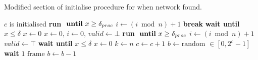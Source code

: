 \begin{algorithm}[h]
\caption{Modified section of initialise procedure for when network found.}
\label{lst:pseudoInitMulti}
\begin{algorithmic}[1]
\Require $c$ is initialised
        \State \textbf{run}  $\text{ \textbf{until} }x \ge \delta_{proc}$ 
        \State $i \gets (i \bmod n) + 1$
                \State {}
                \State \textbf{break}
            \EndIf
        \EndWhile
        \State \textbf{wait until } $x \le \delta$
        \State $x \gets 0$
    \EndWhile
    \State {} 
    \State $x \gets 0,\, i \gets 0,\, valid \gets \bot$
        \State \textbf{run}  $\text{ \textbf{until} }x \ge \delta_{proc}$
        \State $i \gets (i \bmod n) + 1$
                \State {}
                    \State $valid \gets \top$
                \EndIf
            \EndIf
        \EndWhile
        \State \textbf{wait until } $x \le \delta$
        \State $x \gets 0$ 
    \EndWhile
        \State $k \gets n$ 
        \State {}
    \Else
            \State $c \gets c+1$
        \EndIf
        \State $b \gets \text{random } \in [0, 2^c -1]$
            \State \textbf{wait} $1 \text{ frame}$
            \State $b \gets b - 1$
        \EndWhile
        \State {}
    \EndIf
\EndProcedure
\end{algorithmic}    
\end{algorithm}


